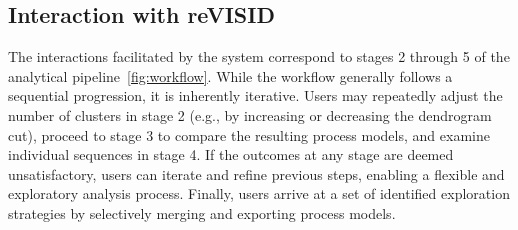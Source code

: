 \documentclass[preprint,journal]{vgtc}            %
\begin{document}



\subsection{Interaction with reVISID}
\label{subsec:interaction}

The interactions facilitated by the system correspond to stages 2 through 5 of the analytical pipeline~\cref{fig:workflow}.
While the workflow generally follows a sequential progression, it is inherently iterative. 
Users may repeatedly adjust the number of clusters in stage 2 (e.g., by increasing or decreasing the dendrogram cut), proceed to stage 3 to compare the resulting process models, and examine individual sequences in stage 4.
If the outcomes at any stage are deemed unsatisfactory, users can iterate and refine previous steps, enabling a flexible and exploratory analysis process.
Finally, users arrive at a set of identified exploration strategies by selectively merging and exporting process models.
\end{document}
